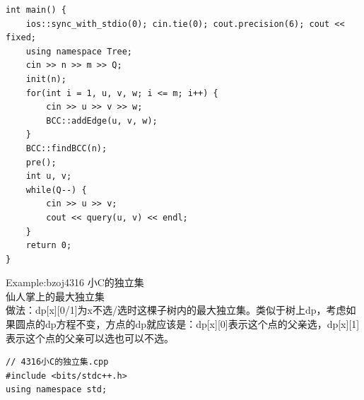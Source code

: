 \documentclass[10pt]{ctexart}
\begin{document}
{\begin{lstlisting}
int main() {
    ios::sync_with_stdio(0); cin.tie(0); cout.precision(6); cout << fixed;
    using namespace Tree;
    cin >> n >> m >> Q;
    init(n);
    for(int i = 1, u, v, w; i <= m; i++) {
        cin >> u >> v >> w;
        BCC::addEdge(u, v, w);
    }
    BCC::findBCC(n);
    pre();
    int u, v;
    while(Q--) {
        cin >> u >> v;
        cout << query(u, v) << endl;
    }
    return 0;
}
\end{lstlisting}

Example:bzoj4316 小C的独立集\\
仙人掌上的最大独立集\\
做法：dp[x][0/1]为x不选/选时这棵子树内的最大独立集。类似于树上dp，考虑如果圆点的dp方程不变，方点的dp就应该是：dp[x][0]表示这个点的父亲选，dp[x][1]表示这个点的父亲可以选也可以不选。
\begin{lstlisting}
// 4316小C的独立集.cpp
#include <bits/stdc++.h>
using namespace std;


\end{lstlisting}}
\end{document}

